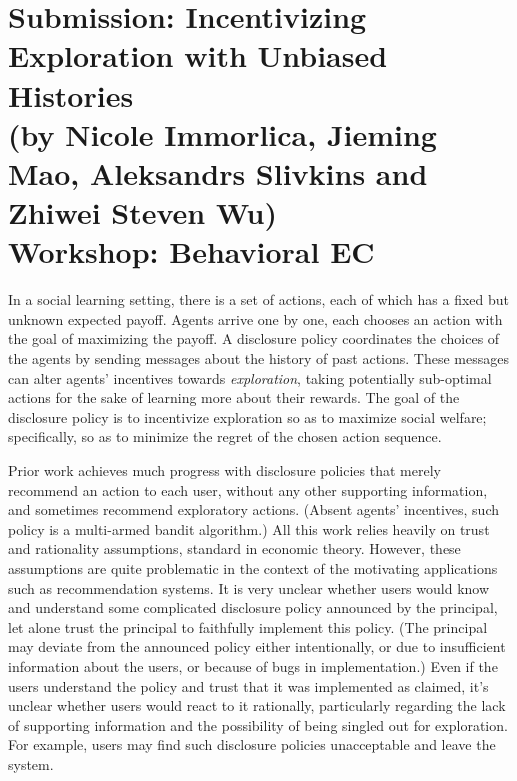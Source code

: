 \documentclass[11pt,letterpaper]{article}
\begin{document}

\section*{Submission: Incentivizing Exploration with Unbiased Histories \\
{\large (by Nicole Immorlica, Jieming Mao, Aleksandrs Slivkins and Zhiwei Steven Wu)}\\
{\large Workshop: Behavioral EC}
}


In a social learning setting, there is a set of actions, each of which has a fixed but unknown expected payoff. Agents arrive one by one, each chooses an action with the goal of maximizing the payoff.  A disclosure policy coordinates the choices of the agents by sending messages about the history of past actions. These messages can alter agents' incentives towards \emph{exploration}, taking potentially sub-optimal actions for the sake of learning more about their rewards. The goal of the disclosure policy is to incentivize exploration so as  to maximize social welfare; specifically, so as to minimize the regret of the chosen action sequence.

Prior work achieves much progress with disclosure policies that merely recommend an action to each user, without any other supporting information, and sometimes recommend exploratory actions. (Absent agents' incentives, such policy is a multi-armed bandit algorithm.) All this work relies heavily on trust and rationality assumptions, standard in economic theory. However, these assumptions are quite problematic in the context of the motivating applications such as recommendation systems. It is very unclear whether users would know and understand some complicated disclosure policy announced  by the principal, let alone trust the principal to faithfully implement this policy. (The principal may deviate from the announced policy either intentionally, or due to insufficient information about the users, or because of bugs in implementation.) Even if the users understand the policy and trust that it was implemented as claimed, it's unclear whether users would react to it rationally, particularly regarding the lack of supporting information and the possibility of being singled out for exploration. For example, users may find such disclosure policies unacceptable and leave the system.
\end{document}
